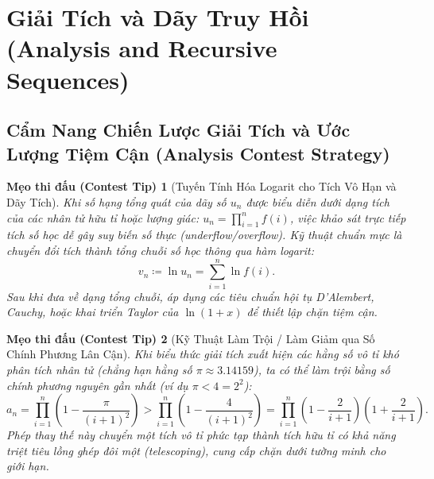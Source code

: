 \documentclass{article}
\newtheorem{tip}{Mẹo thi đấu (Contest Tip)}
\begin{document}

\section{Giải Tích và Dãy Truy Hồi (Analysis and Recursive Sequences)}

\subsection{Cẩm Nang Chiến Lược Giải Tích và Ước Lượng Tiệm Cận (Analysis Contest Strategy)}

\begin{tip}[Tuyến Tính Hóa Logarit cho Tích Vô Hạn và Dãy Tích]
Khi số hạng tổng quát của dãy số $u_n$ được biểu diễn dưới dạng tích của các nhân tử hữu tỉ hoặc lượng giác: $u_n = \prod_{i=1}^n f(i)$, việc khảo sát trực tiếp tích số học dễ gây suy biến số thực (underflow/overflow). Kỹ thuật chuẩn mực là chuyển đổi tích thành tổng chuỗi số học thông qua hàm logarit:
\begin{equation}
    v_n \coloneqq \ln u_n = \sum_{i=1}^n \ln f(i).
\end{equation}
Sau khi đưa về dạng tổng chuỗi, áp dụng các tiêu chuẩn hội tụ D'Alembert, Cauchy, hoặc khai triển Taylor của $\ln(1 + x)$ để thiết lập chặn tiệm cận.
\end{tip}

\begin{tip}[Kỹ Thuật Làm Trội / Làm Giảm qua Số Chính Phương Lân Cận]
Khi biểu thức giải tích xuất hiện các hằng số vô tỉ khó phân tích nhân tử (chẳng hạn hằng số $\pi \approx 3.14159$), ta có thể làm trội bằng số chính phương nguyên gần nhất (ví dụ $\pi < 4 = 2^2$):
\begin{equation}
    a_n = \prod_{i=1}^n \left(1 - \frac{\pi}{(i+1)^2}\right) > \prod_{i=1}^n \left(1 - \frac{4}{(i+1)^2}\right) = \prod_{i=1}^n \left(1 - \frac{2}{i+1}\right)\left(1 + \frac{2}{i+1}\right).
\end{equation}
Phép thay thế này chuyển một tích vô tỉ phức tạp thành tích hữu tỉ có khả năng triệt tiêu lồng ghép đôi một (telescoping), cung cấp chặn dưới tường minh cho giới hạn.
\end{tip}
\end{document}
